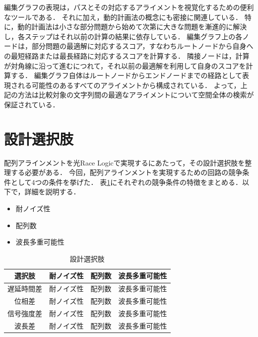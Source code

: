 編集グラフの表現は，パスとその対応するアライメントを視覚化するための便利なツールである．
それに加え，動的計画法の概念にも密接に関連している．
特に，動的計画法は小さな部分問題から始めて次第に大きな問題を漸進的に解決し，各ステップはそれ以前の計算の結果に依存している．
編集グラフ上の各ノードは，部分問題の最適解に対応するスコア，すなわちルートノードから自身への最短経路または最長経路に対応するスコアを計算する．
隣接ノードは，計算が対角線に沿って進むにつれて，それ以前の最適解を利用して自身のスコアを計算する．
編集グラフ自体はルートノードからエンドノードまでの経路として表現される可能性のあるすべてのアライメントから構成されている．
よって，上記の方法は比較対象の文字列間の最適なアライメントについて空間全体の検索が保証されている．

\section{設計選択肢}
配列アラインメントを光Race Logicで実現するにあたって，その設計選択肢を整理する必要がある．
今回，配列アラインメントを実現するための回路の競争条件として4つの条件を挙げた．
表\ref{tab:sentakushi}にそれぞれの競争条件の特徴をまとめる．以下で，詳細を説明する．

\begin{itemize}
\item 耐ノイズ性\\

\item 配列数\\

\item 波長多重可能性\\
\end{itemize}
\begin{table}[t]
\begin{center}
\caption{設計選択肢 }
\begin{tabular}{|c|c|c|c|}\hline
選択肢&耐ノイズ性&配列数&波長多重可能性 \\ \hline \hline
遅延時間差&耐ノイズ性&配列数&波長多重可能性 \\ \hline
位相差&耐ノイズ性&配列数&波長多重可能性 \\ \hline
信号強度差&耐ノイズ性&配列数&波長多重可能性 \\ \hline
波長差&耐ノイズ性&配列数&波長多重可能性 \\ \hline
\end{tabular}
\label{tab:sentakushi}
\end{center}
\end{table}

